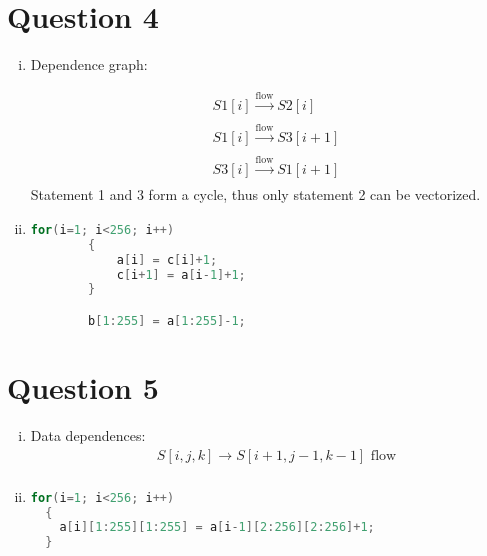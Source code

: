 \documentclass[11pt]{amsart}
\begin{document}
\section*{Question 4}
\begin{enumerate}[(i)]
  \item Dependence graph:

    \begin{align*}
      &S1[i]\xrightarrow[]{\text{flow}} S2[i]\\
      &S1[i]\xrightarrow[]{\text{flow}} S3[i+1]\\
      &S3[i]\xrightarrow[]{\text{flow}} S1[i+1]
    \end{align*}
    Statement 1 and 3 form a cycle, thus only statement 2 can be vectorized.
  \item 
  \begin{lstlisting}[language = c]
        for(i=1; i<256; i++)
        {
            a[i] = c[i]+1;
            c[i+1] = a[i-1]+1;
        }

        b[1:255] = a[1:255]-1;
  \end{lstlisting}
\end{enumerate}
\vfill
\section*{Question 5}
\begin{enumerate}[(i)]
\item Data dependences:
\begin{align*}
& S[i,j,k]\to S[i+1,j-1,k-1] \text{ flow}\\
\end{align*}
\item
\begin{lstlisting}[language = c]
  for(i=1; i<256; i++)
  {
    a[i][1:255][1:255] = a[i-1][2:256][2:256]+1;
  }
\end{lstlisting}
\end{enumerate}
\vfill
\end{document}
